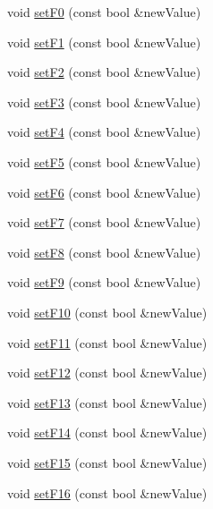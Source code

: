 \begin{DoxyCompactItemize}
void \hyperlink{classIoTT_1_1LocDecoder_ae947a49c6655d2912839d9032fcf0a46}{set\+F0} (const bool \&new\+Value)
\item 
void \hyperlink{classIoTT_1_1LocDecoder_ae1aab97da28929fe5da043eb58295ada}{set\+F1} (const bool \&new\+Value)
\item 
void \hyperlink{classIoTT_1_1LocDecoder_ad7df25a09f6a25b9869eba5671f55973}{set\+F2} (const bool \&new\+Value)
\item 
void \hyperlink{classIoTT_1_1LocDecoder_aa76fd0ad9d6ab28805d3f2a1a97fab4c}{set\+F3} (const bool \&new\+Value)
\item 
void \hyperlink{classIoTT_1_1LocDecoder_a5eb0fc4661df614b298d8e54934559f0}{set\+F4} (const bool \&new\+Value)
\item 
void \hyperlink{classIoTT_1_1LocDecoder_afb9028105d0e9f3440ad4f72ac1385bf}{set\+F5} (const bool \&new\+Value)
\item 
void \hyperlink{classIoTT_1_1LocDecoder_ae83b4bde9fed996fd18818875ea72017}{set\+F6} (const bool \&new\+Value)
\item 
void \hyperlink{classIoTT_1_1LocDecoder_a161e0001a8ed2fbd6260269cec830218}{set\+F7} (const bool \&new\+Value)
\item 
void \hyperlink{classIoTT_1_1LocDecoder_a31555a406af698ad87be5aa0e54f6532}{set\+F8} (const bool \&new\+Value)
\item 
void \hyperlink{classIoTT_1_1LocDecoder_a32e6f6844d89a116fcb750dea86fb0a8}{set\+F9} (const bool \&new\+Value)
\item 
void \hyperlink{classIoTT_1_1LocDecoder_a35283471e9b8cc893d04bdf71487ce0b}{set\+F10} (const bool \&new\+Value)
\item 
void \hyperlink{classIoTT_1_1LocDecoder_ac81445f413f23a6e13ecbdf3a1910686}{set\+F11} (const bool \&new\+Value)
\item 
void \hyperlink{classIoTT_1_1LocDecoder_ae8eb191639ba1ee137cb4c1ee07de2c9}{set\+F12} (const bool \&new\+Value)
\item 
void \hyperlink{classIoTT_1_1LocDecoder_a5528d28f81227fc6d88de6228c045480}{set\+F13} (const bool \&new\+Value)
\item 
void \hyperlink{classIoTT_1_1LocDecoder_a914e4e860e6440b3fcff32c6de2a0e28}{set\+F14} (const bool \&new\+Value)
\item 
void \hyperlink{classIoTT_1_1LocDecoder_ae0c9aeac7d21161d898f515ddaffa851}{set\+F15} (const bool \&new\+Value)
\item 
void \hyperlink{classIoTT_1_1LocDecoder_a3a38b63ec4f7f9f5f6731e8d328b053c}{set\+F16} (const bool \&new\+Value)

\end{DoxyCompactItemize}

